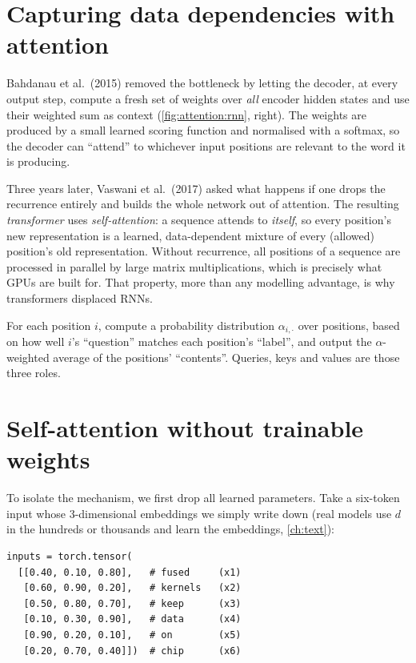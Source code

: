 \section{Capturing data dependencies with attention}\label{sec:attention:deps}

Bahdanau et al.\ (2015) removed the bottleneck by letting the decoder, at every output step,
compute a fresh set of weights over \emph{all} encoder hidden states and use their weighted sum as
context (\cref{fig:attention:rnn}, right). The weights are produced by a small learned scoring
function and normalised with a softmax, so the decoder can ``attend'' to whichever input positions
are relevant to the word it is producing.

Three years later, Vaswani et al.\ (2017) asked what happens if one drops the recurrence entirely
and builds the whole network out of attention. The resulting \emph{transformer} uses
\emph{self-attention}: a sequence attends to \emph{itself}, so every position's new representation
is a learned, data-dependent mixture of every (allowed) position's old representation. Without
recurrence, all positions of a sequence are processed in parallel by large matrix multiplications,
which is precisely what GPUs are built for. That property, more than any modelling advantage, is
why transformers displaced RNNs.

\begin{keyidea}
For each position $i$, compute a probability distribution $\alpha_{i,\cdot}$ over positions,
based on how well $i$'s ``question'' matches each position's ``label'', and output the
$\alpha$-weighted average of the positions' ``contents''. Queries, keys and values are those
three roles.
\end{keyidea}

\section{Self-attention without trainable weights}\label{sec:attention:simple}

To isolate the mechanism, we first drop all learned parameters. Take a six-token input whose
3-dimensional embeddings we simply write down (real models use $d$ in the hundreds or thousands
and learn the embeddings, \cref{ch:text}):

\begin{lstlisting}[caption={The running example: six tokens with toy 3-d embeddings.},label={lst:attention:inputs}]
inputs = torch.tensor(
  [[0.40, 0.10, 0.80],   # fused     (x1)
   [0.60, 0.90, 0.20],   # kernels   (x2)
   [0.50, 0.80, 0.70],   # keep      (x3)
   [0.10, 0.30, 0.90],   # data      (x4)
   [0.90, 0.20, 0.10],   # on        (x5)
   [0.20, 0.70, 0.40]])  # chip      (x6)
\end{lstlisting}

